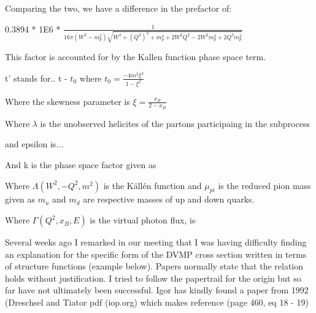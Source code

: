         Comparing the two, we have a difference in the prefactor of:
        
        0.3894 * 1E6 * $\frac{1}{16\pi(W^2-m_p^2)\sqrt{W^4 + (Q^2)^2+m_p^4+2W^2Q^2-2W^2m_p^2+2Q^2m_p^2}}$
        
        This factor is accounted for by the Kallen function phase space term.
        
        
        
        
        t' stands for.. t - $t_0$ where $t_0 = \frac{-4m^2\xi^2}{1-\xi^2}$
        
           Where the skewness parameter is $\xi = \frac{x_B}{2-x_B}$ 
           
        
        
            Where $\lambda$ is the unobserved helicites of the partons participaing in the subprocess
            
         and epsilon is... 
            
            
            
            
         
               
            And k is the phase space factor given as 
            
                Where $\Lambda(W^2,-Q^2,m^2)$ is the Källén function and $\mu_{pi}$ is the reduced pion mass given as 
            $m_u$ and $m_d$ are respective masses of up and down quarks.
            
             Where $\Gamma (Q^2, x_B, E)$ is the virtual photon flux, is 

\fi


Several weeks ago I remarked in our meeting that I was having difficulty finding an explanation for the specific form of the DVMP cross section written in terms of structure functions (example below). Papers normally state that the relation holds without justification. I tried to follow the papertrail for the origin but so far have not ultimately been successful. Igor has kindly found a paper from 1992 (Dreschsel and Tiator pdf (iop.org) which makes reference (page 460, eq 18 - 19) \cite{Dreschsel1992ThresholdNucleons}
\cite{Bedlinskiy2014ExclusiveCLAS}


